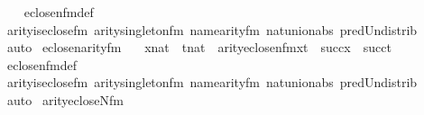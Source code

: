 \begin{isabellebody}
%
\isadelimproof
\ \ %
\endisadelimproof
%
\isatagproof
{}\isamarkupfalse%
\ eclose{\isacharunderscore}{\kern0pt}n{}{\isacharunderscore}{\kern0pt}fm{\isacharunderscore}{\kern0pt}def\ \isanewline
\ \ \isamarkupfalse%
\ arity{\isacharunderscore}{\kern0pt}is{\isacharunderscore}{\kern0pt}eclose{\isacharunderscore}{\kern0pt}fm\ arity{\isacharunderscore}{\kern0pt}singleton{\isacharunderscore}{\kern0pt}fm\ name{}arity{\isacharunderscore}{\kern0pt}{\isacharunderscore}{\kern0pt}fm\ nat{\isacharunderscore}{\kern0pt}union{\isacharunderscore}{\kern0pt}abs{}\ pred{\isacharunderscore}{\kern0pt}Un{\isacharunderscore}{\kern0pt}distrib\isanewline
\ \ \isamarkupfalse%
\ auto%
\endisatagproof
{\isafoldproof}%
%
\isadelimproof
\isanewline
%
\endisadelimproof
\isanewline
{}\isamarkupfalse%
\ eclose{\isacharunderscore}{\kern0pt}n{}arity{\isacharunderscore}{\kern0pt}{\isacharunderscore}{\kern0pt}fm\ {\isacharcolon}{\kern0pt}\isanewline
\ \ {\isachardoublequoteopen}{\isasymlbrakk}x{\isasymin}nat\ {\isacharsemicolon}{\kern0pt}\ t{\isasymin}nat{\isasymrbrakk}\ {\isasymLongrightarrow}\ arity{\isacharparenleft}{\kern0pt}eclose{\isacharunderscore}{\kern0pt}n{}{\isacharunderscore}{\kern0pt}fm{\isacharparenleft}{\kern0pt}x{\isacharcomma}{\kern0pt}t{\isacharparenright}{\kern0pt}{\isacharparenright}{\kern0pt}\ {\isacharequal}{\kern0pt}\ succ{\isacharparenleft}{\kern0pt}x{\isacharparenright}{\kern0pt}\ {\isasymunion}\ succ{\isacharparenleft}{\kern0pt}t{\isacharparenright}{\kern0pt}{\isachardoublequoteclose}\isanewline
%
\isadelimproof
\ \ %
\endisadelimproof
%
\isatagproof
{}\isamarkupfalse%
\ eclose{\isacharunderscore}{\kern0pt}n{}{\isacharunderscore}{\kern0pt}fm{\isacharunderscore}{\kern0pt}def\ \isanewline
\ \ \isamarkupfalse%
\ arity{\isacharunderscore}{\kern0pt}is{\isacharunderscore}{\kern0pt}eclose{\isacharunderscore}{\kern0pt}fm\ arity{\isacharunderscore}{\kern0pt}singleton{\isacharunderscore}{\kern0pt}fm\ name{}arity{\isacharunderscore}{\kern0pt}{\isacharunderscore}{\kern0pt}fm\ nat{\isacharunderscore}{\kern0pt}union{\isacharunderscore}{\kern0pt}abs{}\ pred{\isacharunderscore}{\kern0pt}Un{\isacharunderscore}{\kern0pt}distrib\isanewline
\ \ \isamarkupfalse%
\ auto%
\endisatagproof
{\isafoldproof}%
%
\isadelimproof
\isanewline
%
\endisadelimproof
\isanewline
{}\isamarkupfalse%
\ arity{\isacharunderscore}{\kern0pt}ecloseN{\isacharunderscore}{\kern0pt}fm\ {\isacharcolon}{\kern0pt}\isanewline

\end{isabellebody}
